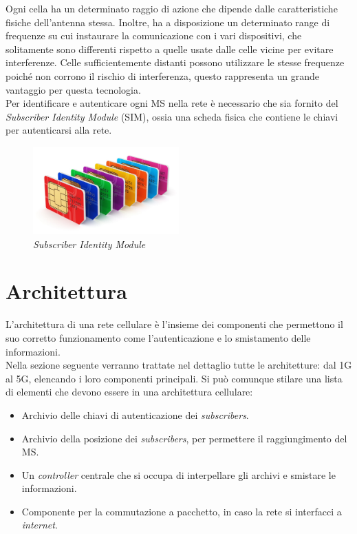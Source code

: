 Ogni cella ha un determinato raggio di azione che dipende dalle caratteristiche fisiche dell'antenna stessa. Inoltre, 
ha a disposizione un determinato range di frequenze su cui instaurare la comunicazione con i vari dispositivi, che solitamente
sono differenti rispetto a quelle usate dalle celle vicine per evitare interferenze.
Celle sufficientemente distanti possono utilizzare le stesse frequenze poiché non corrono il rischio di interferenza, questo rappresenta
un grande vantaggio per questa tecnologia.\\
\clearpage
\noindent Per identificare e autenticare ogni MS nella rete è necessario che sia fornito del \textit{Subscriber Identity Module} (SIM), ossia una scheda fisica 
che contiene le chiavi per autenticarsi alla rete.
\begin{figure}[h]
    \centering
    \includegraphics[width=0.5\textwidth]{images/simcard.jpg}
    \caption{\textit{Subscriber Identity Module}}
\end{figure}

\section{Architettura}
L'architettura di una rete cellulare è l'insieme dei componenti che permettono il suo corretto funzionamento come l'autenticazione e lo smistamento delle informazioni.\\
Nella sezione seguente verranno trattate nel dettaglio tutte le architetture: dal 1G al 5G, elencando i loro componenti principali. Si può comunque stilare una lista di elementi 
che devono essere in una architettura cellulare:
\begin{itemize}
    \item Archivio delle chiavi di autenticazione dei \textit{subscribers}.
    \item Archivio della posizione dei \textit{subscribers}, per permettere il raggiungimento del MS.
    \item Un \textit{controller} centrale che si occupa di interpellare gli archivi e smistare le informazioni.
    \item Componente per la commutazione a pacchetto, in caso la rete si interfacci a \textit{internet}.
\end{itemize}
